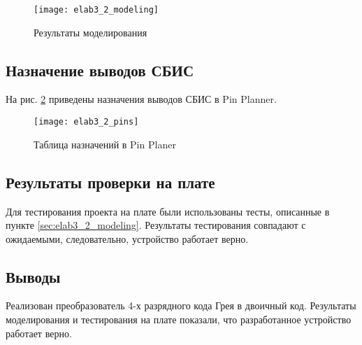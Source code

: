 \begin{figure}[H]
\begin{center}
	\texttt{[image: elab3\_2\_modeling]}
	\caption{Результаты моделирования}
	\label{fig:elab3_2_modeling}
\end{center}
\end{figure}

\subsection{Назначение выводов СБИС}

На рис. \ref{fig:elab3_2_pins} приведены назначения выводов СБИС в Pin Planner.

\begin{figure}[H]
\begin{center}
	\texttt{[image: elab3\_2\_pins]}
	\caption{Таблица назначений в Pin Planer}
	\label{fig:elab3_2_pins}
\end{center}
\end{figure}

\subsection{Результаты проверки на плате}

Для тестирования проекта на плате были использованы тесты, описанные в пункте \ref{sec:elab3_2_modeling}. Результаты тестирования совпадают с ожидаемыми, следовательно, устройство работает верно.

\subsection{Выводы}

Реализован преобразователь 4-х разрядного кода Грея в двоичный код. Результаты моделирования и тестирования на плате показали, что разработанное устройство работает верно.

